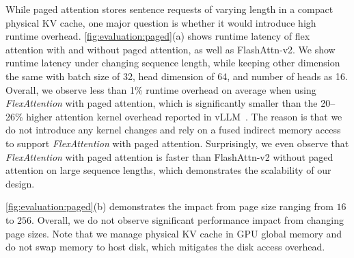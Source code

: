 While paged attention stores sentence requests of varying length in a compact physical KV cache, one major question is whether it would introduce high runtime overhead.
\autoref{fig:evaluation:paged}(a) shows runtime latency of flex attention with and without paged attention, as well as FlashAttn-v2.
We show runtime latency under changing sequence length, while keeping other dimension the same with batch size of 32, head dimension of 64, and number of heads as 16.
Overall, we observe less than 1\% runtime overhead on average when using \textit{FlexAttention} with paged attention, which is significantly smaller than the 20–26\% higher attention kernel overhead reported in vLLM~\cite{vLLM}.
The reason is that we do not introduce any kernel changes and rely on a fused indirect memory access to support \textit{FlexAttention} with paged attention.
Surprisingly, we even observe that \textit{FlexAttention} with paged attention is faster than FlashAttn-v2 without paged attention on large sequence lengths, which demonstrates the scalability of our design.

\autoref{fig:evaluation:paged}(b) demonstrates the impact from page size ranging from $16$ to $256$. Overall, we do not observe significant performance impact from changing page sizes.
Note that we manage physical KV cache in GPU global memory and do not swap memory to host disk, which mitigates the disk access overhead.





